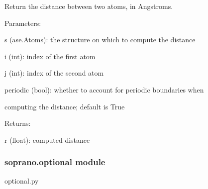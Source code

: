 \documentclass[letterpaper,10pt,english]{sphinxmanual}
\begin{document}

\begin{fulllineitems}
\label{doctree/soprano.measure:soprano.measure.euclideanDistance}
Return the distance between two atoms, in Angstroms.

\begin{DUlineblock}{0em}
\item[] Parameters:
\item[]
\begin{DUlineblock}{\DUlineblockindent}
\item[] s (ase.Atoms): the structure on which to compute the distance
\item[] i (int): index of the first atom
\item[] j (int): index of the second atom
\item[] periodic (bool): whether to account for periodic boundaries when 
\item[]
\begin{DUlineblock}{\DUlineblockindent}
\item[] computing the distance; default is True
\end{DUlineblock}
\end{DUlineblock}
\end{DUlineblock}

\begin{DUlineblock}{0em}
\item[] Returns:
\item[]
\begin{DUlineblock}{\DUlineblockindent}
\item[] r (float): computed distance
\end{DUlineblock}
\end{DUlineblock}

\end{fulllineitems}



\subsubsection{soprano.optional module}
\label{doctree/soprano.optional:module-soprano.optional}\label{doctree/soprano.optional::doc}\label{doctree/soprano.optional:soprano-optional-module}
optional.py
\end{document}

